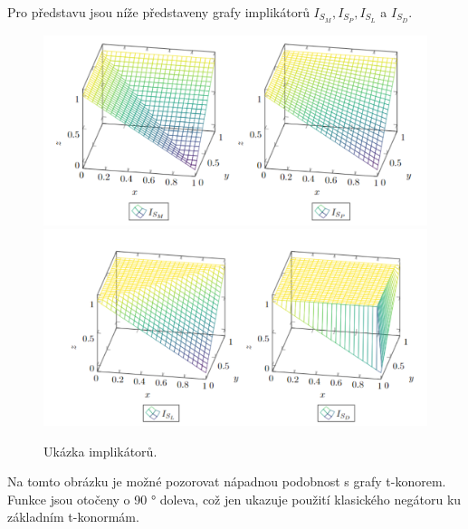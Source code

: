 Pro představu jsou níže představeny grafy implikátorů $I_{S_M}, I_{S_P}, I_{S_L}$ a $I_{S_D}.$
\begin{figure}[H]
    \caption{ Uk\' azka implik\' ator\r u.}
                \hspace{-1cm}
                \includegraphics[scale=0.650]{template-fig/impl1.pdf}
                \centering
                \hspace{1cm}
                \includegraphics[scale=0.650]{template-fig/impl2.pdf}
                \centering
    \end{figure}

Na tomto obrázku je možné pozorovat nápadnou podobnost s grafy t-konorem. Funkce jsou otočeny o 90 ° doleva, což jen ukazuje použití klasick\' eho negátoru ku základním t-konormám. 



